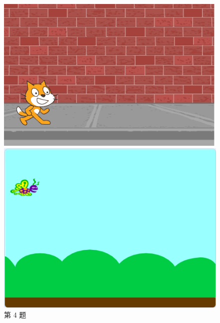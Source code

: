 \documentclass[10pt, a4paper]{article}
\begin{document}
\begin{enumerate}
\begin{figure}[htbp]
\begin{minipage}[t]{.25\textwidth}
                \includegraphics[width=\textwidth]{figure/4.png}
                \caption*{第 4 题}
            \end{minipage}
            \begin{minipage}[t]{.33\textwidth}
                \centering
                \begin{minipage}[t]{.63\textwidth}
                    \centering
                    \includegraphics[width=\textwidth]{figure/5-1.png}
                \end{minipage}
                \begin{minipage}[t]{.32\textwidth}
                    \centering

\end{minipage}
\end{minipage}
\end{figure}
\end{enumerate}
\end{document}
